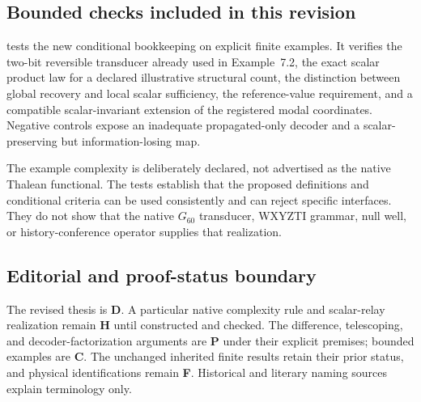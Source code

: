 \subsection{Bounded checks included in this revision}
 tests the new conditional bookkeeping on explicit finite examples. It verifies the two-bit reversible transducer already used in Example~7.2, the exact scalar product law for a declared illustrative structural count, the distinction between global recovery and local scalar sufficiency, the reference-value requirement, and a compatible scalar-invariant extension of the registered modal coordinates. Negative controls expose an inadequate propagated-only decoder and a scalar-preserving but information-losing map.

The example complexity is deliberately declared, not advertised as the native Thalean functional. The tests establish that the proposed definitions and conditional criteria can be used consistently and can reject specific interfaces. They do not show that the native $G_{60}$ transducer, WXYZTI grammar, null well, or history-conference operator supplies that realization.

\subsection{Editorial and proof-status boundary}
The revised thesis is \textbf{D}. A particular native complexity rule and scalar-relay realization remain \textbf{H} until constructed and checked. The difference, telescoping, and decoder-factorization arguments are \textbf{P} under their explicit premises; bounded examples are \textbf{C}. The unchanged inherited finite results retain their prior status, and physical identifications remain \textbf{F}. Historical and literary naming sources explain terminology only.

